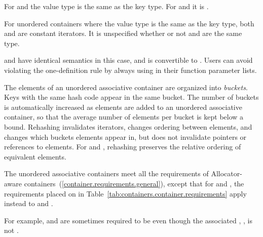 \pnum
For  and  the value type is
the same as the key type.  For  and
 it is .

\pnum
For unordered containers where the value type is the same as the key
type, both  and  are constant
iterators. It is unspecified whether or not  and
 are the same type.
\begin{note}  and  have identical
semantics in this case, and  is convertible to
. Users can avoid violating the one-definition rule
by always using  in their function parameter lists.
\end{note}

\pnum
{}%
%
The elements of an unordered associative container are organized into
\textit{buckets}.  Keys with the same hash code appear in the same
bucket.  The number of buckets is automatically increased as elements
are added to an unordered associative container, so that the average
number of elements per bucket is kept below a bound.  Rehashing
invalidates iterators, changes ordering between elements, and changes
which buckets elements appear in, but does not invalidate pointers or
references to elements. For  and
, rehashing preserves the relative ordering of
equivalent elements.

\pnum
The unordered associative containers meet all the requirements of Allocator-aware
containers~(\ref{container.requirements.general}), except that for
 and , the requirements placed on 
in Table~\ref{tab:containers.container.requirements} apply instead to 
and . \begin{note} For example,  and 
are sometimes required to be  even though the associated
, , is not
. \end{note}

